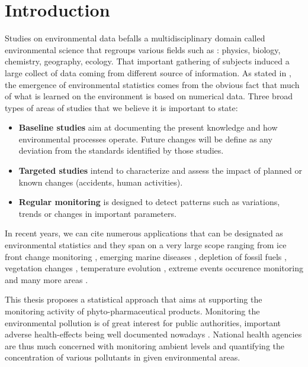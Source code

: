 \chapter{Introduction}\label{chp:1}



Studies on environmental data befalls a multidisciplinary domain called environmental science that regroups various fields such as : physics, biology, chemistry, geography, ecology. That important gathering of subjects induced a large collect of data coming from different source of information. As stated in \cite{Manly2008}, the emergence of environmental statistics comes from the obvious fact that much of what is learned on the environment is based on numerical data. Three broad types of areas of studies that we believe it is important to state: 
\begin{itemize}
    \item \textbf{Baseline studies} aim at documenting the present knowledge and how environmental processes operate. Future changes will be define as any deviation from the standards identified by those studies.
    \item \textbf{Targeted studies} intend to characterize and assess the impact of planned or known changes (accidents, human activities). 
    \item \textbf{Regular monitoring} is designed to detect patterns such as variations, trends or changes in important parameters.  
\end{itemize}
In recent years, we can cite numerous applications that can be designated as environmental statistics and they span on a very large scope ranging from ice front change monitoring \cite{BUNCE_2018}, emerging marine diseases \cite{Harvell1999}, depletion of fossil fuels \citep{Hoeoek2013}, vegetation changes \citep{Zheng2021}, temperature evolution \citep{Shi2022}, extreme events occurence monitoring \citep{Zhao2010} and many more areas \citep{Ozgul2010,Mori2012}. 

This thesis proposes a statistical approach that aims at supporting the monitoring activity of phyto-pharmaceutical products. Monitoring the environmental pollution is of great interest for public authorities, important adverse health-effects being well documented nowadays \citep{khopkar2007,Marchant2018,NOUGADERE201432}. National health agencies are thus much concerned with monitoring ambient levels and quantifying the concentration of various pollutants in given environmental areas. 

